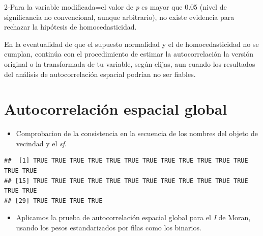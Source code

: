 \documentclass[11pt,]{article}
\newenvironment{Shaded}{\begin{snugshade}}{\end{snugshade}}
\newcommand{\KeywordTok}[1]{\textcolor[rgb]{0.13,0.29,0.53}{\textbf{#1}}}
\newcommand{\DataTypeTok}[1]{\textcolor[rgb]{0.13,0.29,0.53}{#1}}
\newcommand{\DecValTok}[1]{\textcolor[rgb]{0.00,0.00,0.81}{#1}}
\newcommand{\StringTok}[1]{\textcolor[rgb]{0.31,0.60,0.02}{#1}}
\newcommand{\OperatorTok}[1]{\textcolor[rgb]{0.81,0.36,0.00}{\textbf{#1}}}
\newcommand{\NormalTok}[1]{#1}
\providecommand{\tightlist}{%
\setlength{\itemsep}{0pt}\setlength{\parskip}{0pt}}
\begin{document}
2-Para la variable modificada=el valor de \emph{p} es mayor que 0.05
(nivel de significancia no convencional, aunque arbitrario), no existe
evidencia para rechazar la hipótesis de homocedasticidad.

En la eventualidad de que el supuesto normalidad y el de
homocedasticidad no se cumplan, continúa con el procedimiento de estimar
la autocorrelación la versión original o la transformada de tu variable,
según elijas, aun cuando los resultados del análisis de autocorrelación
espacial podrían no ser fiables.

\section{Autocorrelación espacial
global}\label{autocorrelaciuxf3n-espacial-global}

\begin{itemize}
\tightlist
\item
  Comprobacion de la consistencia en la secuencia de los nombres del
  objeto de vecindad y el \emph{sf}.
\end{itemize}

\begin{Shaded}
\end{Shaded}

\begin{verbatim}
##  [1] TRUE TRUE TRUE TRUE TRUE TRUE TRUE TRUE TRUE TRUE TRUE TRUE TRUE TRUE
## [15] TRUE TRUE TRUE TRUE TRUE TRUE TRUE TRUE TRUE TRUE TRUE TRUE TRUE TRUE
## [29] TRUE TRUE TRUE TRUE
\end{verbatim}

\begin{itemize}
\tightlist
\item
  Aplicamos la prueba de autocorrelación espacial global para el
  \emph{I} de Moran, usando los pesos estandarizados por filas como los
  binarios.
\end{itemize}

\begin{Shaded}
\end{Shaded}
\end{document}
